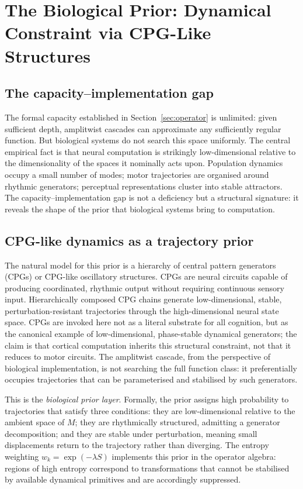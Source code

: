 \documentclass[12pt, a4paper]{article}
\theoremstyle{remark}
\theoremstyle{definition}
\begin{document}
\section{The Biological Prior: Dynamical Constraint via CPG-Like Structures}
\label{sec:prior}

\subsection{The capacity--implementation gap}

The formal capacity established in Section~\ref{sec:operator} is unlimited: given
sufficient depth, amplitwist cascades can approximate any sufficiently regular function.
But biological systems do not search this space uniformly.  The central empirical fact is
that neural computation is strikingly low-dimensional relative to the dimensionality of the
spaces it nominally acts upon.  Population dynamics occupy a small number of modes; motor
trajectories are organised around rhythmic generators; perceptual representations cluster
into stable attractors.  The capacity--implementation gap is not a deficiency but a
structural signature: it reveals the shape of the prior that biological systems bring to
computation.

\subsection{CPG-like dynamics as a trajectory prior}

The natural model for this prior is a hierarchy of central pattern generators (CPGs) or
CPG-like oscillatory structures.  CPGs are neural circuits capable of producing
coordinated, rhythmic output without requiring continuous sensory input.  Hierarchically
composed CPG chains generate low-dimensional, stable, perturbation-resistant trajectories
through the high-dimensional neural state space.  CPGs are invoked here not as a literal
substrate for all cognition, but as the canonical example of low-dimensional, phase-stable
dynamical generators; the claim is that cortical computation inherits this structural
constraint, not that it reduces to motor circuits.  The amplitwist cascade, from the
perspective of biological implementation, is not searching the full function class: it
preferentially occupies trajectories that can be parameterised and stabilised by such
generators.

This is the \emph{biological prior layer}.  Formally, the prior assigns high probability
to trajectories that satisfy three conditions: they are low-dimensional relative to the
ambient space of $M$; they are rhythmically structured, admitting a generator
decomposition; and they are stable under perturbation, meaning small displacements return
to the trajectory rather than diverging.  The entropy weighting $w_k = \exp(-\lambda S)$
implements this prior in the operator algebra: regions of high entropy correspond to
transformations that cannot be stabilised by available dynamical primitives and are
accordingly suppressed.
\end{document}
